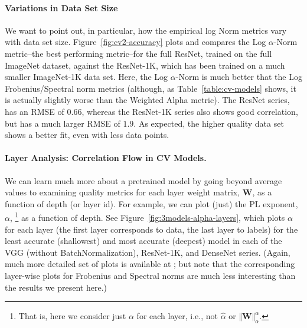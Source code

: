 \paragraph{Variations in Data Set Size}
We want to point out, in particular, how the empirical log Norm metrics vary with data set size.
Figure~\ref{fig:cv2-accuracy} plots and compares the 
Log $\alpha$-Norm
metric--the best performing metric--for the full ResNet, trained on the full ImageNet dataset, against the ResNet-1K, which has been trained on a much smaller ImageNet-1K data set.
Here, the Log $\alpha$-Norm is much better that the Log Frobenius/Spectral norm metrics (although, as Table~\ref{table:cv-models} shows, it is actually slightly worse than the Weighted Alpha metric).
The ResNet series, has an RMSE of $0.66$, whereas the ResNet-1K series also shows good correlation, but has a much larger RMSE of $1.9$.
As expected, the higher quality data set shows a better fit, even with less data points.

\paragraph{Layer Analysis: Correlation Flow in CV Models.}
We can learn much more about a pretrained model by going beyond average values to examining quality metrics for each layer weight matrix, $\mathbf{W}$, as a function of depth (or layer id).  %
For example, we can 
plot (just) the PL exponent, $\alpha$,%
\footnote{That is, here we consider just $\alpha$ for each layer, i.e., not $\hat{\alpha}$ or $\Vert\mathbf{W}\Vert^{\alpha}_{\alpha}$.} 
as a function of depth.
%
See Figure~\ref{fig:3models-alpha-layers}, which plots $\alpha$ for each layer (the first layer corresponds to data, the last layer to labels) for the least accurate (shallowest) and most accurate (deepest) model in each of the VGG (without BatchNormalization), ResNet-1K, and DenseNet series.
(Again, much more detailed set of plots is available at \cite{XXX-WEB-LINK}; but note that the corresponding layer-wise plots for Frobenius and Spectral norms are much less interesting than the results we present here.)

